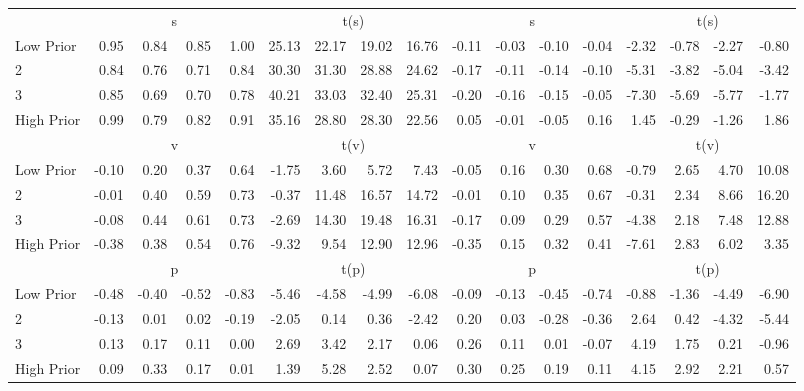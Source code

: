 \begin{table}[!ht]
\begin{tabular}{lrrrrrrrrrrrrrrrr}
  
     & \multicolumn{4}{c}{s} & \multicolumn{4}{c}{t(s)}  & \multicolumn{4}{c}{s} & \multicolumn{4}{c}{t(s)}   \\
     \cmidrule(r){2-5} \cmidrule(r){6-9}  \cmidrule(r){10-13} \cmidrule(r){14-17} 
    Low Prior  & 0.95  & 0.84  & 0.85  & 1.00  & 25.13  & 22.17  & 19.02  & 16.76  & -0.11  & -0.03  & -0.10  & -0.04  & -2.32  & -0.78  & -2.27  & -0.80   \\
    2  & 0.84  & 0.76  & 0.71  & 0.84  & 30.30  & 31.30  & 28.88  & 24.62  & -0.17  & -0.11  & -0.14  & -0.10  & -5.31  & -3.82  & -5.04  & -3.42   \\
    3  & 0.85  & 0.69  & 0.70  & 0.78  & 40.21  & 33.03  & 32.40  & 25.31  & -0.20  & -0.16  & -0.15  & -0.05  & -7.30  & -5.69  & -5.77  & -1.77   \\
    High Prior  & 0.99  & 0.79  & 0.82  & 0.91  & 35.16  & 28.80  & 28.30  & 22.56  & 0.05  & -0.01  & -0.05  & 0.16  & 1.45  & -0.29  & -1.26  & 1.86   \\
    
  
     & \multicolumn{4}{c}{v} & \multicolumn{4}{c}{t(v)}  & \multicolumn{4}{c}{v} & \multicolumn{4}{c}{t(v)}   \\
     \cmidrule(r){2-5} \cmidrule(r){6-9}  \cmidrule(r){10-13} \cmidrule(r){14-17} 
    Low Prior  & -0.10  & 0.20  & 0.37  & 0.64  & -1.75  & 3.60  & 5.72  & 7.43  & -0.05  & 0.16  & 0.30  & 0.68  & -0.79  & 2.65  & 4.70  & 10.08   \\
    2  & -0.01  & 0.40  & 0.59  & 0.73  & -0.37  & 11.48  & 16.57  & 14.72  & -0.01  & 0.10  & 0.35  & 0.67  & -0.31  & 2.34  & 8.66  & 16.20   \\
    3  & -0.08  & 0.44  & 0.61  & 0.73  & -2.69  & 14.30  & 19.48  & 16.31  & -0.17  & 0.09  & 0.29  & 0.57  & -4.38  & 2.18  & 7.48  & 12.88   \\
    High Prior  & -0.38  & 0.38  & 0.54  & 0.76  & -9.32  & 9.54  & 12.90  & 12.96  & -0.35  & 0.15  & 0.32  & 0.41  & -7.61  & 2.83  & 6.02  & 3.35   \\
    
  
     & \multicolumn{4}{c}{p} & \multicolumn{4}{c}{t(p)}  & \multicolumn{4}{c}{p} & \multicolumn{4}{c}{t(p)}   \\
     \cmidrule(r){2-5} \cmidrule(r){6-9}  \cmidrule(r){10-13} \cmidrule(r){14-17} 
    Low Prior  & -0.48  & -0.40  & -0.52  & -0.83  & -5.46  & -4.58  & -4.99  & -6.08  & -0.09  & -0.13  & -0.45  & -0.74  & -0.88  & -1.36  & -4.49  & -6.90   \\
    2  & -0.13  & 0.01  & 0.02  & -0.19  & -2.05  & 0.14  & 0.36  & -2.42  & 0.20  & 0.03  & -0.28  & -0.36  & 2.64  & 0.42  & -4.32  & -5.44   \\
    3  & 0.13  & 0.17  & 0.11  & 0.00  & 2.69  & 3.42  & 2.17  & 0.06  & 0.26  & 0.11  & 0.01  & -0.07  & 4.19  & 1.75  & 0.21  & -0.96   \\
    High Prior  & 0.09  & 0.33  & 0.17  & 0.01  & 1.39  & 5.28  & 2.52  & 0.07  & 0.30  & 0.25  & 0.19  & 0.11  & 4.15  & 2.92  & 2.21  & 0.57   \\
    

\end{tabular}
\end{table}
